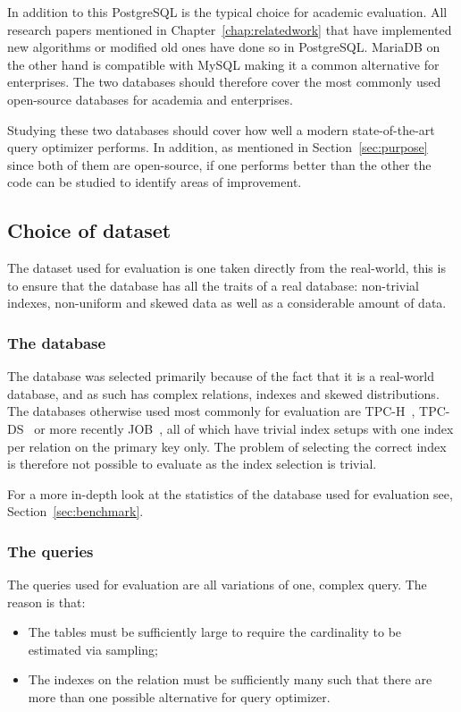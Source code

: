 In addition to this PostgreSQL is the typical choice for academic evaluation.
All research papers mentioned in Chapter~\ref{chap:relatedwork} that have
implemented new algorithms or modified old ones have done so in PostgreSQL.
MariaDB on the other hand is compatible with MySQL making it a common
alternative for enterprises. The two databases should therefore cover the most
commonly used open-source databases for academia and enterprises.

Studying these two databases should cover how well a modern state-of-the-art
query optimizer performs. In addition, as mentioned in Section~\ref{sec:purpose}
since both of them are open-source, if one performs better than the other the
code can be studied to identify areas of improvement.

\subsection{Choice of dataset}
The dataset used for evaluation is one taken directly from the real-world, this
is to ensure that the database has all the traits of a real database:
non-trivial indexes, non-uniform and skewed data as well as a considerable
amount of data.

\subsubsection{The database}
The database was selected primarily because of the fact that it is a real-world
database, and as such has complex relations, indexes and skewed distributions.
The databases otherwise used most commonly for evaluation are
TPC-H~\cite{tpc_th}, TPC-DS~\cite{tpc_tha} or more recently
JOB~\cite{leis_2015_how_hgaqor}, all of which have trivial index setups with
one index per relation on the primary key only. The problem of selecting the
correct index is therefore not possible to evaluate as the index selection is
trivial.

For a more in-depth look at the statistics of the database used for evaluation
see, Section~\ref{sec:benchmark}.

\subsubsection{The queries}
The queries used for evaluation are all variations of one, complex query. The
reason is that:
\begin{itemize}
\item The tables must be sufficiently large to require the cardinality to be
  estimated via sampling;
\item The indexes on the relation must be sufficiently many such that there are
  more than one possible alternative for query optimizer.
\end{itemize}

